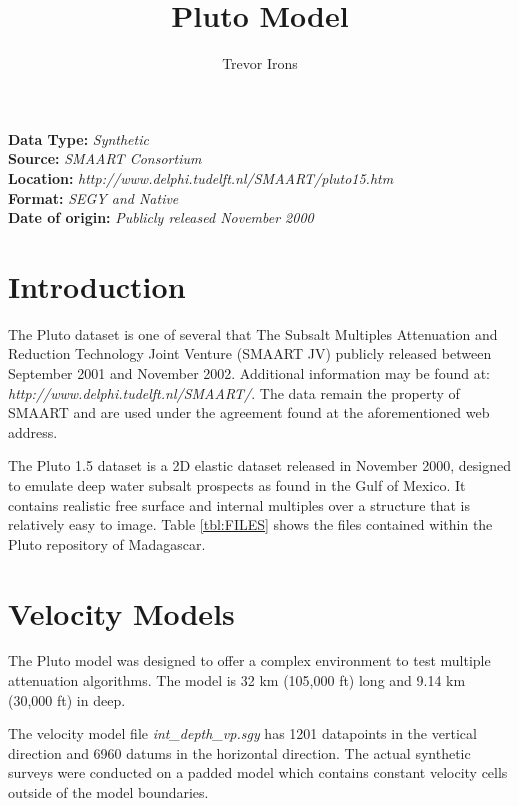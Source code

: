 \title{Pluto Model}
\author{Trevor Irons}

\maketitle
\lstset{language=python,numbers=left,numberstyle=\tiny,showstringspaces=false}
\textbf {Data Type:} \emph{Synthetic}\\
\textbf {Source:} \emph{SMAART Consortium}\\
\textbf {Location:} \emph{http://www.delphi.tudelft.nl/SMAART/pluto15.htm}\\
\textbf {Format:} \emph{SEGY and Native} \\
\textbf{Date of origin:} \emph{Publicly released November 2000}\\

\section{Introduction} 
The Pluto dataset is one of several that The Subsalt Multiples Attenuation and Reduction Technology Joint Venture (SMAART JV) 
publicly released between September 2001 and November 2002.  Additional information may be found at:
\\ \emph{http://www.delphi.tudelft.nl/SMAART/}.  The data remain the property of SMAART and are used under the agreement found 
at the aforementioned web address.

The Pluto 1.5 dataset is a 2D elastic dataset released in November 2000, designed to emulate deep water subsalt prospects as 
found in the Gulf of Mexico. It contains realistic free surface and internal multiples over a structure that is relatively 
easy to image. Table \ref{tbl:FILES} shows the files contained within the Pluto repository of Madagascar.  
 
{
\tiny

\normalsize
}

\section{Velocity Models}
The Pluto model was designed to offer a complex environment to test multiple attenuation algorithms.  The model is 32 km 
(105,000 ft) long and 9.14 km (30,000 ft) in deep.  

The velocity model file \textit{int\_depth\_vp.sgy} has 1201 datapoints in the vertical direction and 6960 datums in 
the horizontal direction. The actual synthetic surveys were conducted on a padded model which contains constant velocity 
cells outside of the model boundaries.   

